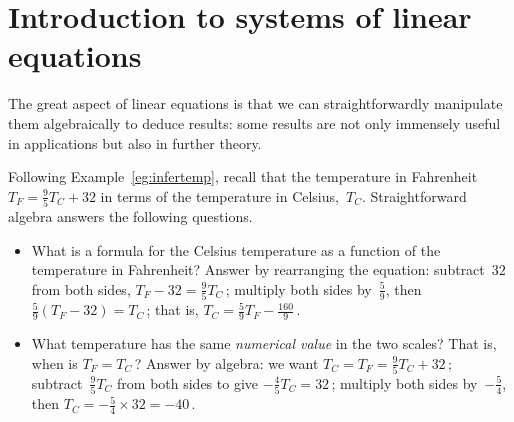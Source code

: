 
\section{Introduction to systems of linear equations}
\label{sec:isle}
\secttoc

\begin{comment}
\pooliv{p.58--64} \layiv{\S1.1} \holti{\S1.1}
\end{comment}


The great aspect of linear equations is that we can straightforwardly manipulate them algebraically to deduce results: some results are not only immensely useful in applications but also in further theory.

\begin{example} \label{eg:tempman}
Following Example~\ref{eg:infertemp}, recall that the temperature in Fahrenheit \(T_F=\frac95T_C+32\) in terms of the temperature in Celsius,~\(T_C\).
Straightforward algebra answers the following questions.
\begin{itemize}
\item What is a formula for the Celsius temperature as a function of the temperature in Fahrenheit?  
Answer by rearranging the equation: subtract~\(32\) from both sides, \(T_F-32=\frac95T_C\)\,;  multiply both sides by~\(\frac59\), then \(\frac59(T_F-32)=T_C\)\,; that is, \(T_C=\frac59T_F-\frac{160}9\)\,.

\item What temperature has the same \emph{numerical value} in the two scales?  That is, when is \(T_F=T_C\)\,?  Answer by algebra: we want \(T_C=T_F=\frac95T_C+32\)\,; subtract~\(\frac95T_C\) from both sides to give \(-\frac45T_C=32\)\,; multiply both sides by~\(-\frac54\), then \(T_C=-\frac54\times32=-40\)\,. 
\end{itemize}
\end{example}



